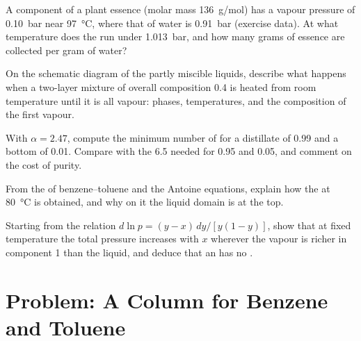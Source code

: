 \begin{exercise}[$\star\star$]\label{exo:b2:liquid-vapour-diagrams:8}
A component of a plant essence (molar mass \qty{136}{g/mol}) has a vapour
pressure of \qty{0.10}{bar} near \qty{97}{\degreeCelsius}, where that of water is
\qty{0.91}{bar} (exercise data). At what temperature does the  run under \qty{1.013}{bar}, and how many grams of essence are
collected per gram of water?
\end{exercise}

\begin{exercise}[$\star\star$]\label{exo:b2:liquid-vapour-diagrams:9}
On the schematic diagram of the partly miscible liquids, describe what happens
when a two-layer mixture of overall composition 0.4 is heated from room
temperature until it is all vapour: phases, temperatures, and the composition
of the first vapour.
\end{exercise}

\begin{exercise}[$\star\star\star$]\label{exo:b2:liquid-vapour-diagrams:10}
With $\alpha = 2.47$, compute the minimum number of  for a
distillate of 0.99 and a bottom of 0.01. Compare with the 6.5 needed for 0.95
and 0.05, and comment on the cost of purity.
\end{exercise}

\begin{exercise}[$\star\star\star$]\label{exo:b2:liquid-vapour-diagrams:11}
From the  of benzene--toluene and the Antoine equations,
explain how the  at \qty{80}{\degreeCelsius} is obtained,
and why on it the liquid domain is at the top.
\end{exercise}

\begin{exercise}[$\star\star\star$]\label{exo:b2:liquid-vapour-diagrams:12}
Starting from the relation $d\ln p = (y - x)\,dy/[y(1 - y)]$, show that at fixed
temperature the total pressure increases with $x$ wherever the vapour is
richer in component 1 than the liquid, and deduce that an  has no
.
\end{exercise}

\section{Problem: A Column for Benzene and Toluene}

